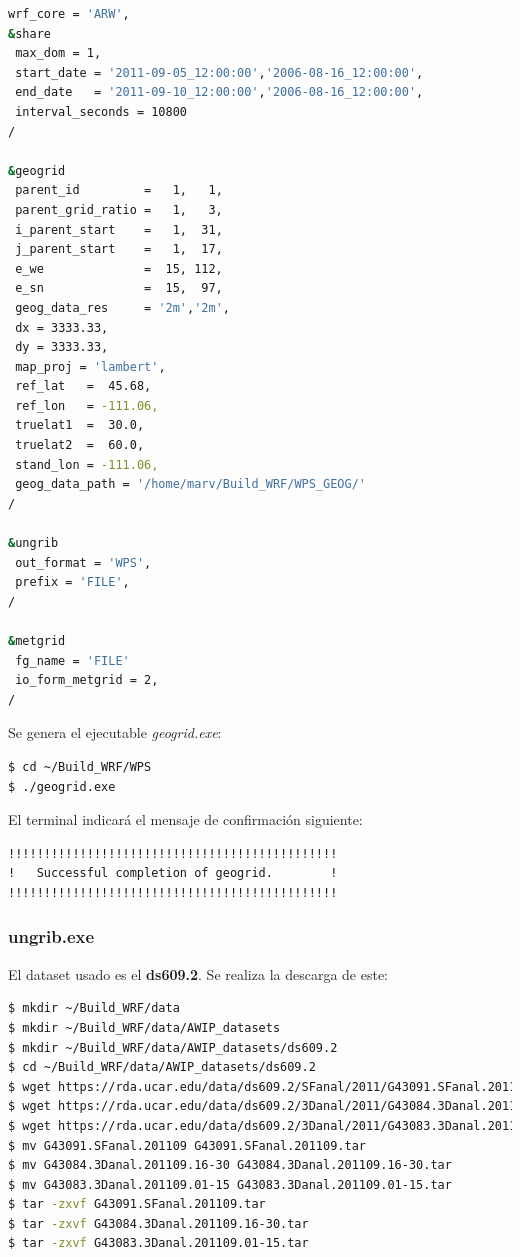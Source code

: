 \documentclass[12pt,letter]{article}
\begin{document}
\begin{lstlisting}[language=bash]
wrf_core = 'ARW',
&share
 max_dom = 1,
 start_date = '2011-09-05_12:00:00','2006-08-16_12:00:00',
 end_date   = '2011-09-10_12:00:00','2006-08-16_12:00:00',
 interval_seconds = 10800
/

&geogrid
 parent_id         =   1,   1,
 parent_grid_ratio =   1,   3,
 i_parent_start    =   1,  31,
 j_parent_start    =   1,  17,
 e_we              =  15, 112,
 e_sn              =  15,  97,
 geog_data_res     = '2m','2m',
 dx = 3333.33,
 dy = 3333.33,
 map_proj = 'lambert',
 ref_lat   =  45.68,
 ref_lon   = -111.06,
 truelat1  =  30.0,
 truelat2  =  60.0,
 stand_lon = -111.06,
 geog_data_path = '/home/marv/Build_WRF/WPS_GEOG/'
/

&ungrib
 out_format = 'WPS',
 prefix = 'FILE',
/

&metgrid
 fg_name = 'FILE'
 io_form_metgrid = 2,
/

\end{lstlisting}
\noindent Se genera el ejecutable \textit{geogrid.exe}:
\begin{lstlisting}
$ cd ~/Build_WRF/WPS
$ ./geogrid.exe
\end{lstlisting}

\noindent El terminal indicar\'a el mensaje de confirmaci\'on siguiente:
\begin{lstlisting}
!!!!!!!!!!!!!!!!!!!!!!!!!!!!!!!!!!!!!!!!!!!!!!
!   Successful completion of geogrid.        !
!!!!!!!!!!!!!!!!!!!!!!!!!!!!!!!!!!!!!!!!!!!!!!
\end{lstlisting}

\subsubsection*{ungrib.exe}
El dataset usado es el \textbf{ds609.2}. Se realiza la descarga de este:
\begin{lstlisting}[language=bash]
$ mkdir ~/Build_WRF/data
$ mkdir ~/Build_WRF/data/AWIP_datasets
$ mkdir ~/Build_WRF/data/AWIP_datasets/ds609.2
$ cd ~/Build_WRF/data/AWIP_datasets/ds609.2
$ wget https://rda.ucar.edu/data/ds609.2/SFanal/2011/G43091.SFanal.201109
$ wget https://rda.ucar.edu/data/ds609.2/3Danal/2011/G43084.3Danal.201109.16-30
$ wget https://rda.ucar.edu/data/ds609.2/3Danal/2011/G43083.3Danal.201109.01-15
$ mv G43091.SFanal.201109 G43091.SFanal.201109.tar
$ mv G43084.3Danal.201109.16-30 G43084.3Danal.201109.16-30.tar
$ mv G43083.3Danal.201109.01-15 G43083.3Danal.201109.01-15.tar
$ tar -zxvf G43091.SFanal.201109.tar
$ tar -zxvf G43084.3Danal.201109.16-30.tar
$ tar -zxvf G43083.3Danal.201109.01-15.tar
\end{lstlisting}
\end{document}
